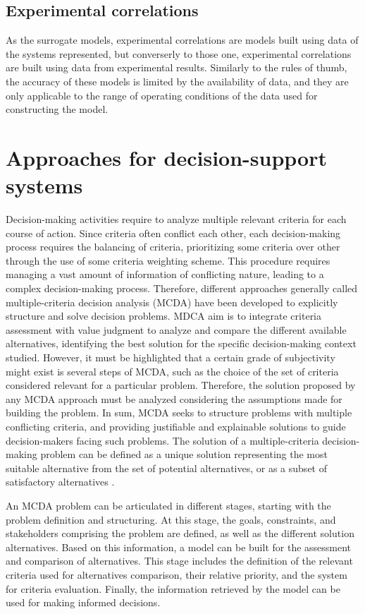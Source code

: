 \begin{refsection}[referencesCh1]
\subsection{Experimental correlations}
As the surrogate models, experimental correlations are models built using data of the systems represented, but converserly to those one, experimental correlations are built using data  from experimental results. Similarly to the rules of thumb, the accuracy of these models is limited by the availability of data, and they are only applicable to the range of operating conditions of the data used for constructing the model.

\section{Approaches for decision-support systems}
Decision-making activities require to analyze multiple relevant criteria for each course of action. Since criteria often conflict each other, each decision-making process requires the balancing of criteria, prioritizing some criteria over other through the use of some criteria weighting scheme. This procedure requires managing a vast amount of information of conflicting nature, leading to a complex decision-making process. Therefore, different approaches generally called multiple-criteria decision analysis (MCDA) have been developed to explicitly structure and solve decision problems. MDCA aim is to integrate criteria assessment with value judgment to analyze and compare the different available alternatives, identifying the best solution for the specific decision-making context studied. However, it must be highlighted that a certain grade of subjectivity might exist is several steps of MCDA, such as the choice of the set of criteria considered relevant for a particular problem. Therefore, the solution proposed by any MCDA approach must be analyzed considering the assumptions made for building the problem. In sum, MCDA seeks to structure problems with multiple conflicting criteria, and providing justifiable and explainable solutions to guide decision-makers facing such problems. The solution of a multiple-criteria decision-making problem can be defined as a unique solution representing the most suitable alternative from the set of potential alternatives,
or as a subset of satisfactory alternatives \citep{belton2002multiple}.

An MCDA problem can be articulated in different stages, starting with the problem definition and structuring. At this stage, the goals, constraints, and stakeholders comprising the problem are defined, as well as the different solution alternatives. Based on this information, a model can be built for the assessment and comparison of alternatives. This stage includes the definition of the relevant criteria used for alternatives comparison, their relative priority, and the system for criteria evaluation. Finally, the information retrieved by the model can be used for making informed decisions.


\end{refsection}
